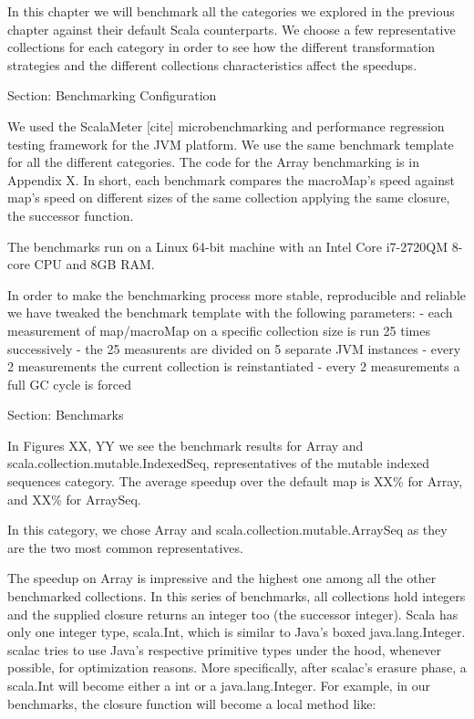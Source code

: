 In this chapter we will benchmark all the categories we explored in
the previous chapter against their default Scala counterparts. We choose a few
representative collections for each category in order to see how the different
transformation strategies and the different collections characteristics affect
the speedups.

Section: Benchmarking Configuration

We used the ScalaMeter [cite] microbenchmarking and performance regression
testing framework for the JVM platform. We use the same benchmark template for
all the different categories. The code for the Array benchmarking is in Appendix
X. In short, each benchmark compares the macroMap's speed against map's speed
on different sizes of the same collection applying the same closure, the
successor function.

The benchmarks run on a Linux 64-bit machine with an Intel Core i7-2720QM 8-core
CPU and 8GB RAM.

In order to make the benchmarking process more stable, reproducible and reliable
we have tweaked the benchmark template with the following parameters:
- each measurement of map/macroMap on a specific collection size is run 25
times successively
- the 25 measurents are divided on 5 separate JVM instances
- every 2 measurements the current collection is reinstantiated
- every 2 measurements a full GC cycle is forced


Section: Benchmarks

In Figures XX, YY we see the benchmark results for Array
and scala.collection.mutable.IndexedSeq, representatives of the mutable indexed
sequences category. The average speedup over the default map is XX\% for Array,
and XX\% for ArraySeq.

In this category, we chose Array and scala.collection.mutable.ArraySeq as they
are the two most common representatives.

The speedup on Array is impressive and the highest one among all the other
benchmarked collections. In this series of benchmarks, all collections hold
integers and the supplied closure returns an integer too (the successor
integer). Scala has only one integer type, scala.Int, which is similar to Java's
boxed java.lang.Integer. scalac tries to use Java's respective primitive types
under the hood, whenever possible, for optimization reasons. More specifically,
after scalac's erasure phase, a scala.Int will become either a int or a
java.lang.Integer. For example, in our benchmarks, the closure function will
become a local method like:

